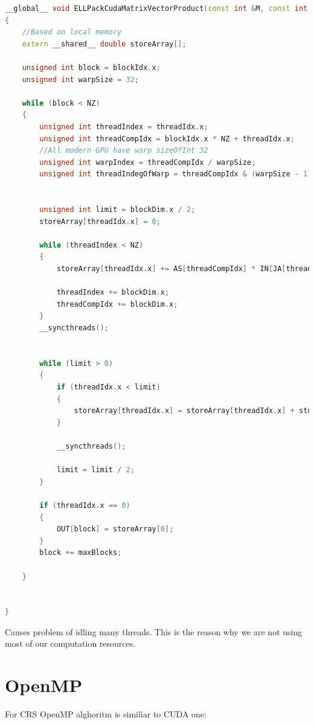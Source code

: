 \documentclass{scrreprt}
\begin{document}
\begin{lstlisting}[language=C++]
__global__ void ELLPackCudaMatrixVectorProduct(const int &M, const int & NZ, const int * JA, const double * AS, double * IN, double * OUT, int & maxBlocks)
{
	//Based on local memory
	extern __shared__ double storeArray[];

	unsigned int block = blockIdx.x;
	unsigned int warpSize = 32;

	while (block < NZ)
	{
		unsigned int threadIndex = threadIdx.x;
		unsigned int threadCompIdx = blockIdx.x * NZ + threadIdx.x;
		//All modern GPU have warp sizeOfInt 32
		unsigned int warpIndex = threadCompIdx / warpSize;
		unsigned int threadIndegOfWarp = threadCompIdx & (warpSize - 1);


		unsigned int limit = blockDim.x / 2;
		storeArray[threadIdx.x] = 0;

		while (threadIndex < NZ)
		{
			storeArray[threadIdx.x] += AS[threadCompIdx] * IN[JA[threadCompIdx]];

			threadIndex += blockDim.x;
			threadCompIdx += blockDim.x;
		}
		__syncthreads();

	
		while (limit > 0)
		{
			if (threadIdx.x < limit)
			{
				storeArray[threadIdx.x] = storeArray[threadIdx.x] + storeArray[threadIdx.x + limit];
			}

			__syncthreads();

			limit = limit / 2;
		}

		if (threadIdx.x == 0)
		{
			OUT[block] = storeArray[0];
		}
		block += maxBlocks;
		
	}


}
\end{lstlisting}

Causes problem of idling many threads. This is the reason why we are not using most of our computation resources.




\chapter{OpenMP}

For CRS OpenMP alghoritm is similiar to CUDA one:\\
\end{document}
